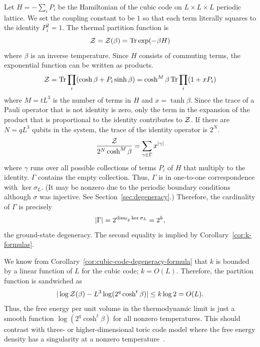 Let $H = -\sum_i P_i$ be the Hamiltonian of the cubic code on $L \times L \times L$ periodic lattice.
We set the coupling constant to be $1$ so that each term literally squares to the identity $P_i^2 = 1$.
The thermal partition function is
\[
 \mathcal{Z} = \mathcal{Z}(\beta) = \mathop{\mathrm{Tr}}\nolimits \exp ( - \beta H )
\]
where $\beta$ is an inverse temperature.
Since $H$ consists of commuting terms,
the exponential function can be written as products.
\[
 \mathcal{Z} = \mathop{\mathrm{Tr}}\nolimits \prod_i (\cosh \beta + P_i \sinh \beta) 
 = \cosh^M \beta \mathop{\mathrm{Tr}}\nolimits \prod_i (1 + x P_i)
\]
where $M=tL^3$ is the number of terms in $H$ and $x = \tanh \beta$.
Since the trace of a Pauli operator that is not identity is zero,
only the term in the expansion of the product 
that is proportional to the identity contributes to $\mathcal{Z}$.
If there are $N=qL^3$ qubits in the system, 
the trace of the identity operator is $2^N$.
\[
 \frac{\mathcal{Z}}{2^N \cosh^M \beta} = \sum_{\gamma \in \Gamma} x^{|\gamma|}
\]
where $\gamma$ runs over all possible collections of terms $P_i$ of $H$
that multiply to the identity. $\Gamma$ contains the empty collection.
Thus, $\Gamma$ is in one-to-one correspondence with $\ker \sigma_L$.
(It may be nonzero due to the periodic boundary conditions
although $\sigma$ was injective. See Section~\ref{sec:degeneracy}.)
Therefore, the cardinality of $\Gamma$ is precisely
\[
 |\Gamma| = 2^{\dim_{\mathbb{F}_2} \ker \sigma_L} = 2^{k} ,
\]
the ground-state degeneracy.
The second equality is implied by Corollary~\ref{cor:k-formulas}.

We know from Corollary~\ref{cor:cubic-code-degeneracy-formula} that $k$ is bounded by
a linear function of $L$ for the cubic code; $k = O(L)$.
Therefore, the partition function is sandwiched as
\[
 | \log \mathcal{Z}(\beta) - L^3\log (2^q \cosh^t \beta) | \le k \log 2 = O(L).
\]
Thus, the free energy per unit volume in the thermodynamic limit
is just a smooth function $\log( 2^q \cosh^t \beta )$ for all nonzero temperatures.
This should contrast with three- or higher-dimensional toric code model 
where the free energy density has a singularity at a nonzero temperature~\cite{NussinovOrtiz2008Autocorrelations}.

